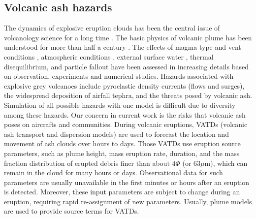 \documentclass[journal abbreviation, manuscript]{copernicus}
\begin{document}
\subsection{Volcanic ash hazards}
The dynamics of explosive eruption clouds has been the central issue of volcanology science for a long time \citep{settle1978volcanic, wilson1978control}.
The basic physics of volcanic plume has been understood for more than half a century \citep{morton1956turbulent, settle1978volcanic, wilson1978control}. The effects of magma type and vent conditions \citep{woods1988fluid, woods1995decompression}, atmospheric conditions \citep{ woods1993moist, sparks1997volcanic, bursik2001effect}, external surface water \citep{koyaguchi1996formation}, thermal disequilibrium, and particle fallout \citep{woods1991particle} have been assessed in increasing details based on observation, experiments and numerical studies.
%
Hazards associated with explosive grey volcanoes include pyroclastic density currents (flows and surges), the widespread deposition of airfall tephra, and the threats posed by volcanic ash. 
%
Simulation of all possible hazards with one model is difficult due to diversity among these hazards. Our concern in current work is the risks that volcanic ash poses on aircrafts and communities. During volcanic eruptions, VATDs (volcanic ash transport and dispersion models) are used to forecast the location and movement of ash clouds over hours to days. Those VATDs use eruption source parameters, such as plume height, mass eruption rate, duration, and the mass fraction distribution of erupted debris finer than about $4 \Phi$ (or $63  \mu$m), which can remain in the cloud for many hours or days. Observational data for such parameters are usually unavailable in the first minutes or hours after an eruption is detected. Moreover, these input parameters are subject to change during an eruption, requiring rapid re-assignment of new parameters. Usually, plume models are used to provide source terms for VATDs. 
%
\end{document}
